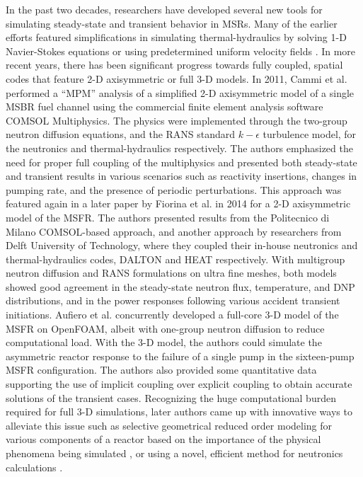 In the past two decades, researchers have developed several
new tools for simulating steady-state and transient behavior in \glspl{MSR}.
Many of the earlier efforts featured simplifications in simulating
thermal-hydraulics by solving 1-D Navier-Stokes equations or using
predetermined uniform velocity fields \cite{krepel_dyn3d-msr_2007}
\cite{kophazi_development_2009}. In more recent years, there has been
significant progress towards fully coupled, spatial codes that feature
2-D axisymmetric or full 3-D models. In 2011, Cammi et al.
\cite{cammi_multi-physics_2011} performed a ``\gls{MPM}'' analysis
of a simplified 2-D axisymmetric model of a single \gls{MSBR} fuel channel
using the commercial finite element analysis software COMSOL Multiphysics. The
physics were implemented through the two-group neutron diffusion
equations, and the \gls{RANS} standard $k-\epsilon$ turbulence model, for the
neutronics and thermal-hydraulics respectively. The
authors emphasized the need for proper full coupling of the multiphysics and
presented both steady-state and transient results in various
scenarios such as reactivity insertions, changes in pumping rate, and the
presence of periodic perturbations. This approach was featured again in a
later paper by Fiorina et al. \cite{fiorina_modelling_2014} in 2014 for a 2-D
axisymmetric model of the
\gls{MSFR}. The authors presented results from the Politecnico di Milano
COMSOL-based approach, and another approach by researchers from Delft
University of Technology, where they coupled their in-house neutronics and
thermal-hydraulics codes, DALTON and HEAT respectively. With multigroup
neutron diffusion and \gls{RANS} formulations on ultra fine meshes, both
models showed good agreement in the steady-state neutron flux, temperature,
and \gls{DNP} distributions, and in the power responses following various
accident transient initiations. Aufiero et al. \cite{aufiero_development_2014}
concurrently developed
a full-core 3-D model of the \gls{MSFR} on OpenFOAM, albeit with one-group
neutron diffusion to reduce computational load. With the 3-D model, the
authors could simulate the asymmetric reactor response to the failure of a
single pump in the sixteen-pump \gls{MSFR} configuration. The authors also
provided some quantitative data supporting the use of implicit coupling over
explicit coupling to obtain accurate solutions of the transient cases.
Recognizing the huge computational burden required for full 3-D simulations, 
later authors came up with innovative ways to alleviate this issue such as
selective geometrical reduced order modeling for various components of a
reactor based on the importance of the physical phenomena being simulated
\cite{zanetti_geometric_2015}, or using a novel, efficient method for
neutronics calculations \cite{laureau_transient_2017}.

